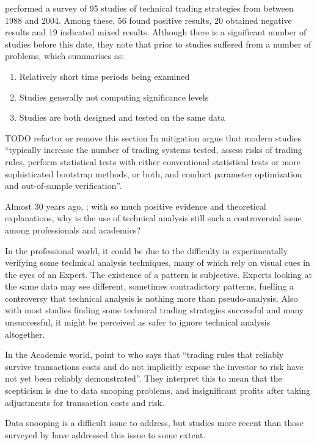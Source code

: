 \documentclass{article}
\theoremstyle{definition}
\begin{document}
\cite{taprofitability} performed a survey of 95 studies of technical trading strategies from between 1988 and 2004. Among these, 56 found positive results, 20 obtained negative results and 19 indicated mixed results. Although there is a significant number of studies before this date, they note that prior to \cite{lukac1988} studies suffered from a number of problems, which \cite{brock1992} summarises as:
\begin{enumerate}[label=\roman*]
\item Relatively short time periods being examined 
\item Studies generally not computing significance levels 
\item Studies are both designed and tested on the same data
\end{enumerate}

TODO refactor or remove this section
In mitigation \cite{taprofitability} argue that modern studies ``typically
increase the number of trading systems tested, assess risks of trading rules,
perform statistical tests with either conventional statistical tests or more sophisticated bootstrap methods, or both, and conduct parameter optimization and out-of-sample verification''.

Almost 30 years ago, \cite{indefenseof} ; with so much positive evidence and theoretical explanations, why is the use of technical analysis still such a controversial issue among professionals and academics? 

In the professional world, it could be due to the difficulty in experimentally verifying some technical analysis techniques, many of which rely on visual cues in the eyes of an Expert. The existence of a pattern is subjective. Experts looking at the same data may see different, sometimes contradictory patterns, fuelling a controversy that technical analysis is nothing more than pseudo-analysis. Also with most studies finding some technical trading strategies successful and many unsuccessful, it might be perceived as safer to ignore technical analysis altogether.

In the Academic world, \cite{taprofitability} point to \cite{assetpricing} who says that ``trading rules that reliably survive transactions costs and do not implicitly expose the investor to risk have not yet been reliably demonstrated''. They interpret this to mean that the scepticism is due to data snooping problems, and insignificant profits after taking adjustments for transaction costs and risk.

Data snooping is a difficult issue to address, but studies more recent than those surveyed by \cite{taprofitability} have addressed this issue to some extent.
\end{document}
